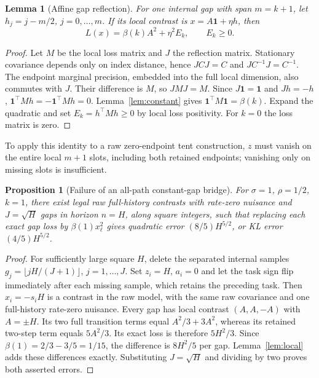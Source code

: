 \documentclass[11pt]{article}
\newtheorem{lemma}{Lemma}
\newtheorem{proposition}{Proposition}
\newcommand{\one}{\mathbf 1}
\newcommand{\sig}{\sigma}
\begin{document}
\begin{lemma}[Affine gap reflection]\label{lem:reflection}
For one internal gap with span $m=k+1$, let $h_j=j-m/2$, $j=0,\ldots,m$.
If its local contrast is $x=A\one+\eta h$, then
\begin{equation}\label{eq:reflection}
 L(x)=\beta(k)A^2+\eta^2 E_k,\qquad E_k\ge0.
\end{equation}
\end{lemma}
\begin{proof}
Let $M$ be the local loss matrix and $J$ the reflection matrix.
Stationary covariance depends only on index distance, hence $JCJ=C$ and
$JC^{-1}J=C^{-1}$. The endpoint marginal precision, embedded into the full
local dimension, also commutes with $J$. Their difference is $M$, so
$JMJ=M$. Since $J\one=\one$ and $Jh=-h$,
$\one^\top Mh=-\one^\top Mh=0$.
Lemma~\ref{lem:constant} gives $\one^\top M\one=\beta(k)$.
Expand the quadratic and set $E_k=h^\top Mh\ge0$ by local loss positivity.
For $k=0$ the loss matrix is zero.
\end{proof}
To apply this identity to a raw zero-endpoint tent construction, $z$ must
vanish on the entire local $m+1$ slots, including both retained endpoints;
vanishing only on missing slots is insufficient.

\begin{proposition}[Failure of an all-path constant-gap bridge]\label{prop:counter}
For $\sig=1$, $\rho=1/2$, $k=1$, there exist legal raw full-history contrasts
with rate-zero nuisance and $J=\sqrt H$ gaps in horizon $n=H$, along square
integers, such that replacing each exact gap loss by
$\beta(1)x_\ell^2$ gives quadratic error $(8/5)H^{5/2}$, or KL error
$(4/5)H^{5/2}$.
\end{proposition}
\begin{proof}
For sufficiently large square $H$, delete the separated internal samples
$g_j=\lfloor jH/(J+1)\rfloor$, $j=1,\ldots,J$. Set $z_i=H$, $a_i=0$ and let
the task sign flip immediately after each missing sample, which retains the
preceding task. Then $x_i=-s_iH$ is a contrast in the raw model, with the same
raw covariance and one full-history rate-zero nuisance. Every gap has local
contrast $(A,A,-A)$ with $A=\pm H$. Its two full transition terms equal
$A^2/3+3A^2$, whereas its retained two-step term equals $5A^2/3$.
Its exact loss is therefore $5H^2/3$. Since
$\beta(1)=2/3-3/5=1/15$, the difference is $8H^2/5$ per gap.
Lemma~\ref{lem:local} adds these differences exactly. Substituting $J=\sqrt H$
and dividing by two proves both asserted errors.
\end{proof}
\end{document}
